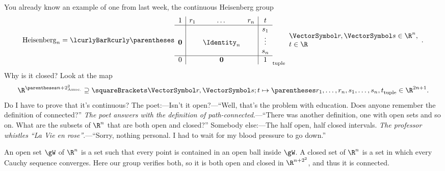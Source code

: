\documentclass[10pt, a4paper, twoside]{lecturenotes}
\newcommand{\Rn}{{\R^n}}
\begin{document}
\begin{lecture}[date=2013-04-23]
\begin{definition}
\[\]
\end{definition}
You already know an example of one from last week, the continuous Heisenberg group\[
\HeisenbergGroup[n]=\setst{\tuple{
\begin{array}{c|ccc|c}
1&r_1&\dotsc&r_n&t\\
\hline
&&&&s_1\\
\nullvec&&\Identity_n&&\vdots\\
&&&&s_n\\
\hline
0&&\nullvec&&1
\end{array}
}}{\begin{array}{l}\vr,\vs\in\Rn,\\ t\in\R\end{array}}\text.
\]
Why is it closed? Look at the map\[
\FunctionBody{\R^{\pa{n+2}^2}\Superset\Helt \vr \vs t} {\tuple{r_1,\dotsc,r_n,s_1,\dotsc,s_n,t}\in\R^{2n+1}}\text.
\]
Do I have to prove that it's continuous? 
The poet:---Isn't it open?---``Well, that's the problem with education. Does anyone remember the definition of connected?'' \emph{The poet answers with the definition of path-connected}.---``There was another definition, one with open sets and so on. What are the subsets of $\Rn$ that are both open and closed?'' Somebody else:---The half open, half closed intervals. \emph{The professor whistles ``La Vie en rose''}.---``Sorry, nothing personal. I had to wait for my blood pressure to go down.''

An open set $\gW$ of $\Rn$ is a set such that every point is contained in an open ball inside $\gW$. A closed set of  $\Rn$ is a set in which every Cauchy sequence converges. Here our group verifies both, so it is both open and closed in $\R^{{n+2}^2}$, and thus it is connected.


\end{lecture}
\end{document}
